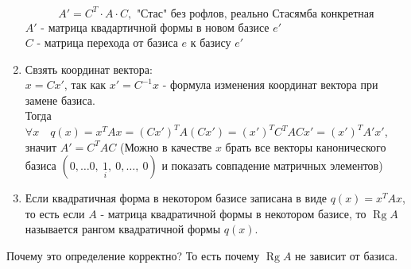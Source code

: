\documentclass[12pt, letterpaper, twoside]{article}
\begin{document}
\begin{enumerate}
        \[A' = C^{T}\cdot A\cdot C,\text{ "Стас" без рофлов, реально Стасямба конкретная}\]
        $A'$ - матрица квадартичной формы в новом базисе  $e'$\\
        $C$ - матрица перехода от базиса $e$ к базису $e'$
        \item[\text{Доказательство:}] Свзять координат вектора:\\
        $x = Cx'$, так как $x' = C^{-1} x$ - формула изменения координат вектора при замене базиса.\\
        Тогда $\forall x\quad q(x) = x^{T} A x = (Cx')^{T} A (C x') = (x')^T C^T A C x' = (x')^{T} A' x'$, значит $A' = C^{T}AC$ \big(Можно в качестве $x$ брать все векторы канонического базиса $(0,\dots 0,\ \underset{i}{1},\ 0,\dots,\ 0)$ и показать совпадение матричных элементов\big)
        \item[\text{Определение:}] Если квадратичная форма в некотором базисе записана в виде $q(x) = x^{T} A x$, то есть если $A$ - матрица квадратичной формы в некотором базисе, то $\operatorname{Rg} A$ называется рангом квадратичной формы $q(x)$.
    \end{enumerate}
    Почему это определение корректно? То есть почему $\operatorname{Rg} A$ не зависит от базиса.
\end{document}
